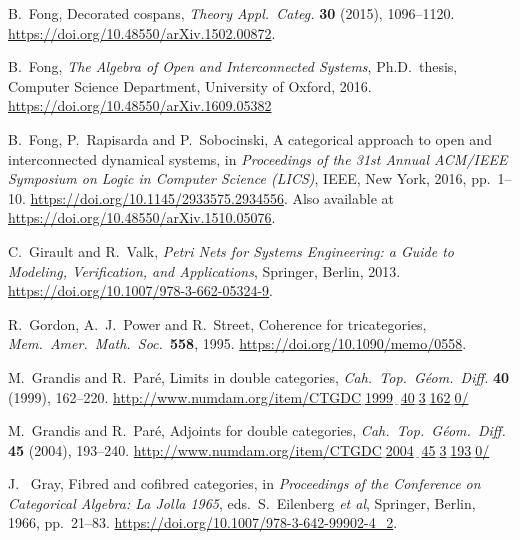 \documentclass[ a4paper, onecolumn, superscriptaddress,10pt, accepted=2022-02-14, issue=3, volume=4, shorttitle=papers/compositionality-4-3 ]{compositionalityarticle}
\begin{document}
\begin{thebibliography}{100}
 B.\ Fong, Decorated cospans, \emph{Theory Appl.\ Categ.} \textbf{30} (2015), 1096--1120.  \hfill \break
\href{https://doi.org/10.48550/arXiv.1502.00872}{https://doi.org/10.48550/arXiv.1502.00872}.

 B.\ Fong, \textsl{The Algebra of Open and Interconnected Systems},
Ph.D.\ thesis, Computer Science Department, University of Oxford, 2016.  \href{https://doi.org/10.48550/arXiv.1609.05382}{https://doi.org/10.48550/arXiv.1609.05382}

 B.\ Fong, P.\ Rapisarda and P.\ Sobocinski, A categorical approach to open and interconnected dynamical systems, in \textsl{Proceedings
of the 31st Annual ACM/IEEE Symposium on Logic in Computer Science (LICS)}, IEEE, New York, 2016, pp.\ 1--10.
\href{https://doi.org/10.1145/2933575.2934556}{https://doi.org/10.1145/2933575.2934556}. Also available at
\href{https://doi.org/10.48550/arXiv.1510.05076}{https://doi.org/10.48550/arXiv.1510.05076}.

 C.\ Girault and R.\ Valk, \textsl{Petri Nets for Systems Engineering: a Guide to Modeling, Verification, and Applications},
Springer, Berlin, 2013. \href{https://doi.org/10.1007/978-3-662-05324-9}{https://doi.org/10.1007/978-3-662-05324-9}.

 R.\ Gordon, A.\ J.\ Power and R.\ Street, Coherence for tricategories, \textsl{Mem.\ Amer.\ Math.\ Soc.\ }\textbf{558}, 1995.
\href{https://doi.org/10.1090/memo/0558}{https://doi.org/10.1090/memo/0558}.

 M.\ Grandis and R.\ Par\'e, Limits in double categories, \textsl{Cah.\ Top.\ G\'eom.\ Diff.} \textbf{40} (1999), 162--220. \href{http://www.numdam.org/item/CTGDC_1999__40_3_162_0/}{http://www.numdam.org/item/CTGDC$\underline{\;}$1999$\underline{\;\;}$40$\underline{\;}$3$\underline{\;}$162$\underline{\;}$0/}

 M.\ Grandis and R.\ Par\'e, Adjoints for double categories,
 \textsl{Cah.\ Top.\ G\'eom.\ Diff.} \textbf{45} (2004), 193--240.
 \href{http://www.numdam.org/item/CTGDC_2004__45_3_193_0/}{http://www.numdam.org/item/CTGDC$\underline{\;}$2004$\underline{\;\;}$45$\underline{\;}$3$\underline{\;}$193$\underline{\;}$0/}

 J. \ Gray, Fibred and cofibred categories, in \textsl{Proceedings of the Conference on Categorical Algebra: La Jolla 1965}, eds.\ S.\
Eilenberg \textit{et al}, Springer, Berlin, 1966, pp.\ 21--83.
\href{https://doi.org/10.1007/978-3-642-99902-4\_2}{https://doi.org/10.1007/978-3-642-99902-4\_2}.


\end{thebibliography}
\end{document}
